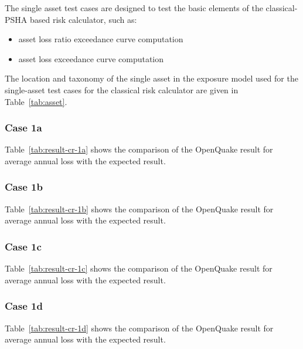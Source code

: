 The single asset test cases are designed to test the basic elements of the classical-PSHA based risk calculator, such as:

\begin{itemize}
\item asset loss ratio exceedance curve computation
\item asset loss exceedance curve computation
\end{itemize}

The location and taxonomy of the single asset in the exposure model used for the single-asset test cases for the classical risk calculator are given in Table~\ref{tab:asset}.

\subsubsection{Case 1a}


Table~\ref{tab:result-cr-1a} shows the comparison of the OpenQuake result for average annual loss with the expected result.

\subsubsection{Case 1b}


Table~\ref{tab:result-cr-1b} shows the comparison of the OpenQuake result for average annual loss with the expected result.

\subsubsection{Case 1c}


Table~\ref{tab:result-cr-1c} shows the comparison of the OpenQuake result for average annual loss with the expected result.

\subsubsection{Case 1d}


Table~\ref{tab:result-cr-1d} shows the comparison of the OpenQuake result for average annual loss with the expected result.

